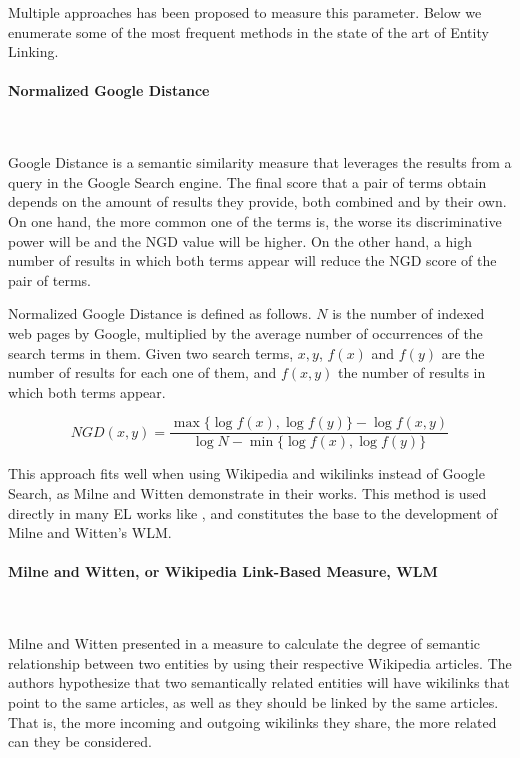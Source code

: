 Multiple approaches has been proposed to measure this parameter. Below we enumerate some of the most frequent methods in the state of the art of Entity Linking.

\paragraph{Normalized Google Distance}~

Google Distance is a semantic similarity measure that leverages the results from a query in the Google Search engine. The final score that a pair of terms obtain depends on the amount of results they provide, both combined and by their own. On one hand, the more common one of the terms is, the worse its discriminative power will be and the NGD value will be higher. On the other hand, a high number of results in which both terms appear will reduce the NGD score of the pair of terms.

Normalized Google Distance is defined as follows. $N$ is the number of indexed web pages by Google, multiplied by the average number of occurrences of the search terms in them. Given two search terms, $x,y$, $f(x)$ and $f(y)$ are the number of results for each one of them, and $f(x,y)$ the number of results in which both terms appear.

\begin{equation}
NGD(x,y) = \frac{\max \{ \log f(x), \log f(y) \} - \log f(x,y)}{\log N - \min \{ \log f(x), \log f(y)\}}
\label{eq:normalizedGoogleDistance}
\end{equation}

This approach fits well when using Wikipedia and wikilinks instead of Google Search, as Milne and Witten demonstrate in their works. This method is used directly in many EL works like \cite{zhang2014}, and constitutes the base to the development of Milne and Witten's WLM.

\paragraph{Milne and Witten, or Wikipedia Link-Based Measure, WLM}~

Milne and Witten presented in \cite{witten2008} a measure to calculate the degree of semantic relationship between two entities by using their respective Wikipedia articles. The authors hypothesize that two semantically related entities will have wikilinks that point to the same articles, as well as they should be linked by the same articles. That is, the more incoming and outgoing wikilinks they share, the more related can they be considered.

